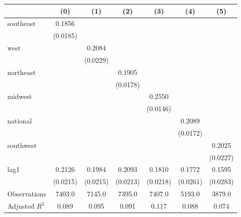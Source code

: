 \begin{tabular}{lcccccc}
\toprule
 & (0) & (1) & (2) & (3) & (4) & (5) \\
\midrule
southeast & 0.1856 &  &  &  &  &  \\
\vspace{0.2cm}
 & (0.0185) &  &  &  &  &  \\
west &  & 0.2084 &  &  &  &  \\
\vspace{0.2cm}
 &  & (0.0229) &  &  &  &  \\
northeast &  &  & 0.1905 &  &  &  \\
\vspace{0.2cm}
 &  &  & (0.0178) &  &  &  \\
midwest &  &  &  & 0.2550 &  &  \\
\vspace{0.2cm}
 &  &  &  & (0.0146) &  &  \\
national &  &  &  &  & 0.2089 &  \\
\vspace{0.2cm}
 &  &  &  &  & (0.0172) &  \\
southwest &  &  &  &  &  & 0.2025 \\
\vspace{0.2cm}
 &  &  &  &  &  & (0.0227) \\
lag1 & 0.2126 & 0.1984 & 0.2093 & 0.1810 & 0.1772 & 0.1595 \\
\vspace{0.2cm}
 & (0.0215) & (0.0215) & (0.0213) & (0.0218) & (0.0261) & (0.0283) \\
\midrule
Observations & 7403.0 & 7145.0 & 7395.0 & 7407.0 & 5193.0 & 3879.0 \\
Adjusted $R^2$ & 0.089 & 0.095 & 0.091 & 0.117 & 0.088 & 0.074 \\
\bottomrule
\end{tabular}